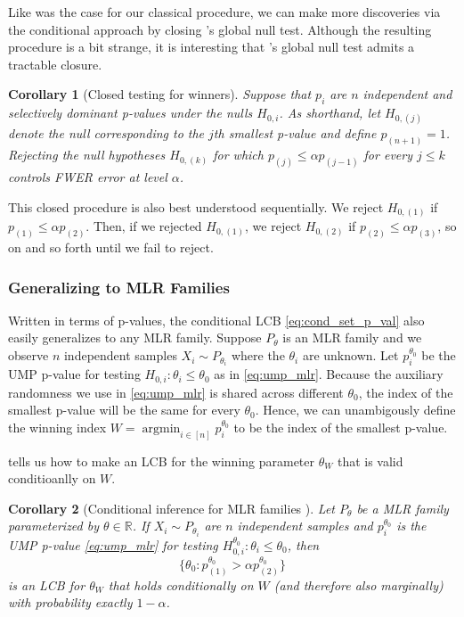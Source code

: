 \documentclass{article}
\DeclareMathOperator*{\argmin}{argmin}
\newtheorem{corollary}{Corollary}
\newcommand{\R}{\mathbb{R}}
\begin{document}
Like was the case for our classical procedure, we can make more discoveries via the conditional approach by closing 's global null test. Although the resulting procedure is a bit strange, it is interesting that 's global null test admits a tractable closure. 

\begin{corollary}[Closed testing for winners]
    \label{cor:cond_closed}
    Suppose that $p_i$ are $n$ independent and selectively dominant p-values under the nulls $H_{0, i}$. As shorthand, let $H_{0, (j)}$ denote the null corresponding to the $j$th smallest p-value and define $p_{(n+1)} = 1$.  Rejecting the null hypotheses $H_{0, (k)}$ for which $p_{(j)} \leq \alpha p_{(j-1)} $ for every $j \leq k$ controls FWER error at level $\alpha$. 
\end{corollary}

This closed procedure is also best understood sequentially. We reject $H_{0, (1)}$ if $p_{(1)} \leq \alpha p_{(2)}$. Then, if we rejected  $H_{0, (1)}$, we reject $H_{0, (2)}$ if $p_{(2)} \leq \alpha p_{(3)}$, so on and so forth until we fail to reject.  

\subsubsection{Generalizing to MLR Families}

Written in terms of p-values, the conditional LCB  \eqref{eq:cond_set_p_val} also easily generalizes to any MLR family. Suppose $P_{\theta}$ is an MLR family and we observe $n$ independent samples $X_i \sim P_{\theta_i}$ where the $\theta_i$ are unknown. Let $p^{\theta_0}_i$ be the UMP p-value for testing $H_{0, i} : \theta_i \leq  \theta_0$ as in \eqref{eq:ump_mlr}.  Because the auxiliary randomness we use in \eqref{eq:ump_mlr} is shared across different $\theta_0$, the index of the smallest p-value will be the same for every $\theta_0$. Hence, we can unambigously define the winning index $W = \argmin_{i \in [n]} p^{\theta_0}_i$ to be the index of the smallest p-value.

 tells us how to make an LCB for the winning parameter $\theta_W$ that is valid conditioanlly on $W$. 

\begin{corollary}[Conditional inference for MLR families ]
    \label{cor:cond_mlr}
    Let $P_{\theta}$ be a MLR family parameterized by $\theta \in \R$. If $X_i \sim P_{\theta_i}$ are $n$ independent samples and $p^{\theta_0}_i$ is the UMP p-value \eqref{eq:ump_mlr} for testing $H^{\theta_0}_{0, i} : \theta_i \leq \theta_0 $, then 
    \begin{equation}
    \label{eq:cond_lcb_mlr}
    \{\theta_0 :  p^{\theta_0}_{(1)} > \alpha p^{\theta_0}_{(2)}\} 
    \end{equation}
    is an LCB for $\theta_W$ that holds conditionally on $W$ (and therefore also marginally) with probability exactly $1-\alpha$. 
\end{corollary}
\end{document}
